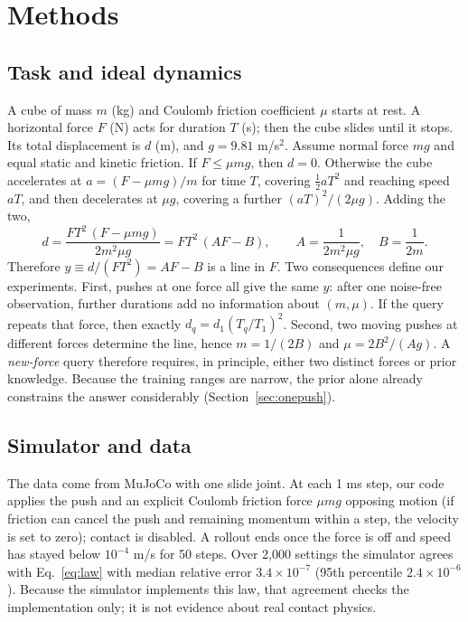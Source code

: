 \documentclass{article}
\begin{document}
\section{Methods}
\subsection{Task and ideal dynamics}\label{sec:physics}
A cube of mass $m$ (kg) and Coulomb friction coefficient $\mu$ starts at rest. A horizontal force $F$ (N) acts for duration $T$ (s); then the cube slides until it stops. Its total displacement is $d$ (m), and $g=9.81$ m/s$^2$. Assume normal force $mg$ and equal static and kinetic friction. If $F\le\mu mg$, then $d=0$. Otherwise the cube accelerates at $a=(F-\mu mg)/m$ for time $T$, covering $\tfrac12 aT^2$ and reaching speed $aT$, and then decelerates at $\mu g$, covering a further $(aT)^2/(2\mu g)$. Adding the two,
\begin{equation}
d=\frac{FT^2\,(F-\mu mg)}{2m^2\mu g}=FT^2\,(AF-B),\qquad A=\frac{1}{2m^2\mu g},\quad B=\frac{1}{2m}.
\label{eq:law}
\end{equation}
Therefore $y\equiv d/(FT^2)=AF-B$ is a line in $F$. Two consequences define our experiments. First, pushes at one force all give the same $y$: after one noise-free observation, further durations add no information about $(m,\mu)$. If the query repeats that force, then exactly $d_q=d_1(T_q/T_1)^2$. Second, two moving pushes at different forces determine the line, hence $m=1/(2B)$ and $\mu=2B^2/(Ag)$. A \emph{new-force} query therefore requires, in principle, either two distinct forces or prior knowledge. Because the training ranges are narrow, the prior alone already constrains the answer considerably (Section~\ref{sec:onepush}).

\subsection{Simulator and data}\label{sec:data}
The data come from MuJoCo with one slide joint. At each 1 ms step, our code applies the push and an explicit Coulomb friction force $\mu mg$ opposing motion (if friction can cancel the push and remaining momentum within a step, the velocity is set to zero); contact is disabled. A rollout ends once the force is off and speed has stayed below $10^{-4}$ m/s for 50 steps. Over 2,000 settings the simulator agrees with Eq.~\eqref{eq:law} with median relative error $3.4\times10^{-7}$ (95th percentile $2.4\times10^{-6}$). Because the simulator implements this law, that agreement checks the implementation only; it is not evidence about real contact physics.
\end{document}
